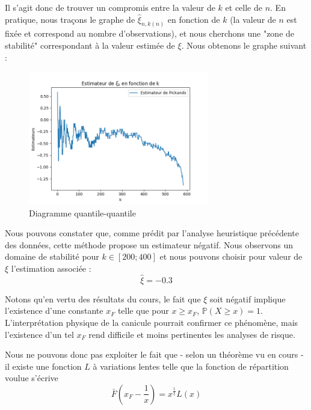 \documentclass[../report.tex]{subfiles}
\begin{document}
\par Il s'agit donc de trouver un compromis entre la valeur de $k$ et celle de $n$. En pratique, nous traçons le graphe de $ \hat{\xi}_{n, k \left( n \right)}$ en fonction de $k$ (la valeur de $n$ est fixée et correspond au nombre d'observations), et nous cherchons une "zone de stabilité" correspondant à la valeur estimée de $\xi$. Nous obtenons le graphe suivant : 
\begin{figure}[H]
  \centering
    \includegraphics[width=0.7\textwidth]{images/part_2/pickands.png}
  \caption{Diagramme quantile-quantile}
\end{figure}

\par Nous pouvons constater que, comme prédit par l'analyse heuristique précédente des données, cette méthode propose un estimateur négatif. Nous observons un domaine de stabilité pour $k \in \left[ 200; 400 \right]$ et nous pouvons choisir pour valeur de $\xi$ l'estimation associée :
\begin{displaymath}
\hat{\xi} = -0.3
\end{displaymath}
\par Notons qu'en vertu des résultats du cours, le fait que $\xi$ soit négatif implique l'existence d'une constante $x_F$ telle que pour $x \geq x_F$, $\mathbb{P} \left( X \geq x \right) = 1$. L'interprétation physique de la canicule pourrait confirmer ce phénomène, mais l'existence d'un tel $x_F$ rend difficile et moins pertinentes les analyses de risque.

\par Nous ne pouvons donc pas exploiter le fait que - selon un théorème vu en cours - il existe une fonction $L$ à variations lentes telle que la fonction de répartition voulue s'écrive
\begin{displaymath}
\bar{F} \left( x_F - \frac{1}{x} \right) = x^{\frac{1}{\xi}} L \left( x \right)
\end{displaymath}
\end{document}
